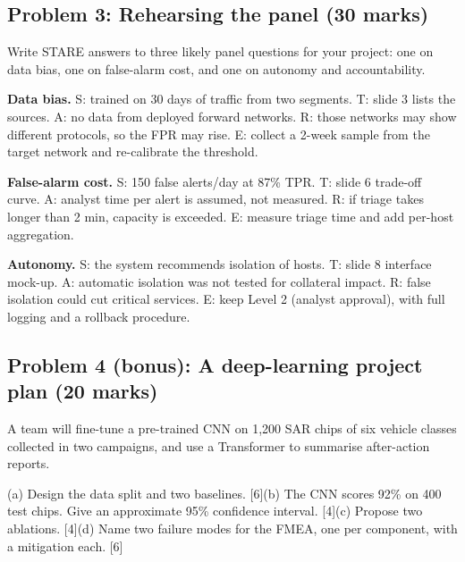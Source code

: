 \documentclass[11pt]{article}
\begin{document}
\subsection{Problem 3: Rehearsing the panel \normalfont\small\color{GreyN}(30 marks)}

\begin{prob}Write STARE answers to three likely panel questions for your project: one on data bias, one on false-alarm cost, and one on autonomy and accountability.\end{prob}

\begin{soln}\textbf{Data bias.} S: trained on 30 days of traffic from two segments. T: slide 3 lists the sources. A: no data from deployed forward networks. R: those networks may show different protocols, so the FPR may rise. E: collect a 2-week sample from the target network and re-calibrate the threshold.

\textbf{False-alarm cost.} S: 150 false alerts/day at 87\% TPR. T: slide 6 trade-off curve. A: analyst time per alert is assumed, not measured. R: if triage takes longer than 2 min, capacity is exceeded. E: measure triage time and add per-host aggregation.

\textbf{Autonomy.} S: the system recommends isolation of hosts. T: slide 8 interface mock-up. A: automatic isolation was not tested for collateral impact. R: false isolation could cut critical services. E: keep Level 2 (analyst approval), with full logging and a rollback procedure.\end{soln}

\subsection{Problem 4 (bonus): A deep-learning project plan \normalfont\small\color{GreyN}(20 marks)}

\begin{prob}A team will fine-tune a pre-trained CNN on 1,200 SAR chips of six vehicle classes collected in two campaigns, and use a Transformer to summarise after-action reports.

(a) Design the data split and two baselines. [6]\newline (b) The CNN scores 92\% on 400 test chips. Give an approximate 95\% confidence interval. [4]\newline (c) Propose two ablations. [4]\newline (d) Name two failure modes for the FMEA, one per component, with a mitigation each. [6]\end{prob}
\end{document}
